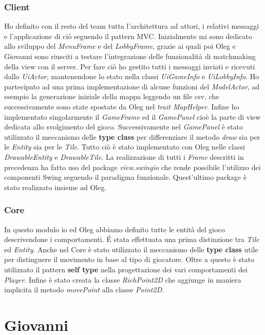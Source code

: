 \subsubsection{Client}
Ho definito con il resto del team tutta l’architettura ad attori, i relativi messaggi e l’applicazione di ciò seguendo il pattern MVC.
Inizialmente mi sono dedicato allo sviluppo del \textit{MenuFrame} e del \textit{LobbyFrame}, grazie ai quali poi Oleg e Giovanni sono riusciti a testare l’integrazione delle funzionalità di matchmaking della view con il server.
Per fare ciò ho gestito tutti i messaggi inviati e ricevuti dallo \textit{UiActor}, mantenendone lo stato nella classi \textit{UiGameInfo} e \textit{UiLobbyInfo}.
Ho partecipato ad una prima implementazione di alcune funzioni del \textit{ModelActor}, ad esempio la generazione iniziale della mappa leggendo un file csv, che successivamente sono state spostate da Oleg nel \textit{trait MapHelper}.
Infine ho implementato singolarmente il \textit{GameFrame} ed il \textit{GamePanel} cioè la parte di view dedicata allo svolgimento del gioco.
Successivamente nel \textit{GamePanel} è stato utilizzato il meccanismo delle \textbf{type class} per differenziare il metodo \textit{draw} sia per le \textit{Entity} sia per le \textit{Tile}. Tutto ciò è stato implementato con Oleg nelle classi \textit{DrawableEntity} e \textit{DrawableTile}.
La realizzazione di tutti i \textit{Frame} descritti in precedenza ha fatto uso del package \textit{view.swingio} che rende possibile l’utilizzo dei componenti Swing seguendo il paradigma funzionale. Quest’ultimo package è stato realizzato insieme ad Oleg.

\subsubsection{Core}
In questo modulo io ed Oleg abbiamo definito tutte le entità del gioco descrivendone i comportamenti. É stata effettuata una prima distinzione tra \textit{Tile} ed \textit{Entity}. 
Anche nel Core è stato utilizzato il meccanismo delle \textbf{type class} utile per distinguere il movimento in base al tipo di giocatore. 
Oltre a questo è stato utilizzato il pattern  \textbf{self type} nella progettazione dei vari comportamenti dei \textit{Player}.
Infine è stato creata la classe \textit{RichPoint2D} che aggiunge in maniera implicita il metodo \textit{movePoint} alla classe \textit{Point2D}.

\section{Giovanni}

